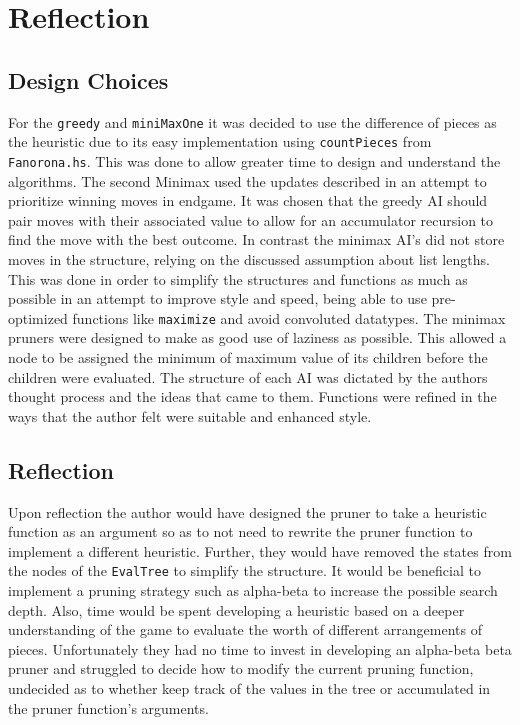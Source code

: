 \documentclass[11pt]{article}
\begin{document}
\newpage
\section{Reflection}
  \subsection*{Design Choices}
  For the \verb|greedy| and \verb|miniMaxOne| it was decided to use the difference of pieces as the heuristic due to its easy implementation using \verb|countPieces| from \verb|Fanorona.hs|. This was done to allow greater time to design and understand the algorithms. The second Minimax used the updates described in an attempt to prioritize winning moves in endgame. It was chosen that the greedy AI should pair moves with their associated value to allow for an accumulator recursion to find the move with the best outcome. In contrast the minimax AI's did not store moves in the structure, relying on the discussed assumption about list lengths. This was done in order to simplify the structures and functions as much as possible in an attempt to improve style and speed, being able to use pre-optimized functions like \verb|maximize| and avoid convoluted datatypes. The minimax pruners were designed to make as good use of laziness as possible. This allowed a node to be assigned the minimum of maximum value of its children before the children were evaluated. The structure of each AI was dictated by the authors thought process and the ideas that came to them. Functions were refined in the ways that the author felt were suitable and enhanced style.

  \subsection*{Reflection}
  Upon reflection the author would have designed the pruner to take a heuristic function as an argument so as to not need to rewrite the pruner function to implement a different heuristic. Further, they would have removed the states from the nodes of the \verb|EvalTree| to simplify the structure. It would be beneficial to implement a pruning strategy such as alpha-beta to increase the possible search depth. Also, time would be spent developing a heuristic based on a deeper understanding of the game to evaluate the worth of different arrangements of pieces. Unfortunately they had no time to invest in developing an alpha-beta beta pruner and struggled to decide how to modify the current pruning function, undecided as to whether keep track of the values in the tree or accumulated in the pruner function's arguments.




\end{document}

